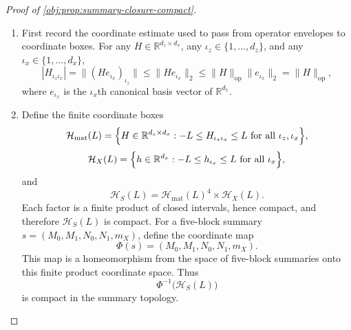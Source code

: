 \documentclass[11pt]{article}
\begin{document}
\begin{proof}[Proof of \cref{obj:prop:summary-closure-compact}]
\begin{enumerate}
\item First record the coordinate estimate used to pass from operator envelopes to coordinate boxes.  For any \(H\in\mathbb R^{d_z\times d_x}\), any \(\iota_z\in\{1,\ldots,d_z\}\), and any \(\iota_x\in\{1,\ldots,d_x\}\),
\[
        |H_{\iota_z\iota_x}|
        =
        \|(H e_{\iota_x})_{\iota_z}\|
        \le
        \|H e_{\iota_x}\|_2
        \le
        \|H\|_{\mathrm{op}}\|e_{\iota_x}\|_2
        =
        \|H\|_{\mathrm{op}},
\]
where \(e_{\iota_x}\) is the \(\iota_x\)th canonical basis vector of \(\mathbb R^{d_x}\). %

\item Define the finite coordinate boxes
\[
\mathcal H_{\mathrm{mat}}(L)
=
\Bigl\{H\in\mathbb R^{d_z\times d_x}:
        -L\le H_{\iota_z\iota_x}\le L
        \text{ for all }\iota_z,\iota_x\Bigr\},
\]
\[
\mathcal H_X(L)
=
\Bigl\{h\in\mathbb R^{d_x}:
        -L\le h_{\iota_x}\le L
        \text{ for all }\iota_x\Bigr\},
\]
and
\[
\mathcal H_S(L)
=
\mathcal H_{\mathrm{mat}}(L)^4\times \mathcal H_X(L).
\]
Each factor is a finite product of closed intervals, hence compact, and therefore \(\mathcal H_S(L)\) is compact.  For a five-block summary \(s=(M_0,M_1,N_0,N_1,m_X)\), define the coordinate map
\[
        \Phi(s)=(M_0,M_1,N_0,N_1,m_X).
\]
This map is a homeomorphism from the space of five-block summaries onto this finite product coordinate space.  Thus
\[
        \Phi^{-1}\bigl(\mathcal H_S(L)\bigr)
\]
is compact in the summary topology. %


\end{enumerate}
\end{proof}
\end{document}
